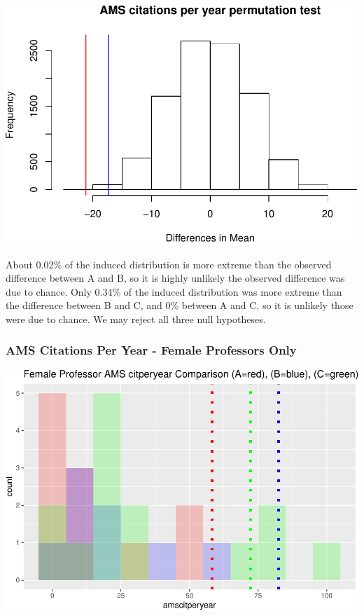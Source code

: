 \documentclass[]{article}
\begin{document}
\includegraphics{final_files/figure-latex/unnamed-chunk-39-1.pdf}

About 0.02\% of the induced distribution is more extreme than the
observed difference between A and B, so it is highly unlikely the
observed difference was due to chance. Only 0.34\% of the induced
distribution was more extreme than the difference between B and C, and
0\% between A and C, so it is unlikely those were due to chance. We may
reject all three null hypotheses.

\hypertarget{ams-citations-per-year---female-professors-only}{%
\subsubsection{AMS Citations Per Year - Female Professors
Only}\label{ams-citations-per-year---female-professors-only}}

\includegraphics{final_files/figure-latex/unnamed-chunk-41-1.pdf}
\end{document}
